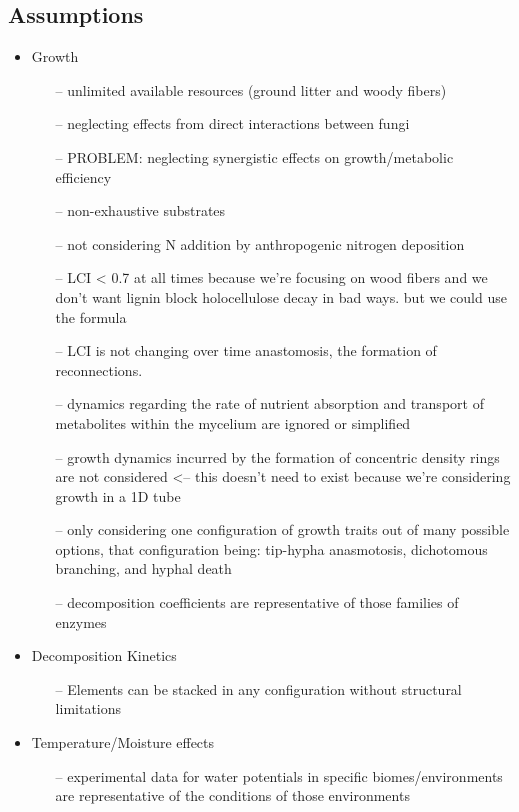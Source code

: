\documentclass[12pt]{article}
\begin{document}
\begin{multicols}{2}
\subsection{Assumptions}

\begin{itemize}
	\item Growth
	\begin{itemize}
		\item[--] unlimited available resources (ground litter and woody fibers)
		\item[--] neglecting effects from direct interactions between fungi
		\item[--] PROBLEM: neglecting synergistic effects on growth/metabolic efficiency
		\item[--] non-exhaustive substrates
		\item[--] not considering N addition by anthropogenic nitrogen deposition
		\item[--] LCI < 0.7 at all times because we're focusing on wood fibers and we don't want lignin block holocellulose decay in bad ways. but we could use the formula
		\item[--] LCI is not changing over time anastomosis, the formation of reconnections. 
		\item[--] dynamics regarding the rate of nutrient absorption and transport of metabolites within the
		mycelium are ignored or simplified
		\item[--] growth dynamics incurred by the formation of concentric density rings are not considered <-- this doesn't need to exist because we're considering growth in a 1D tube
		\item[--] only considering one configuration of growth traits out of many possible options, that configuration being: tip-hypha anasmotosis, dichotomous branching, and hyphal death
		\item[--] decomposition coefficients are representative of those families of enzymes
	\end{itemize}
	\item Decomposition Kinetics
	\begin{itemize}
		\item[--] Elements can be stacked in any configuration without structural limitations
	\end{itemize}
	\item Temperature/Moisture effects
	\begin{itemize}
		\item[--] experimental data for water potentials in specific biomes/environments are representative of the conditions of those environments 

\end{itemize}
\end{itemize}
\end{multicols}
\end{document}
